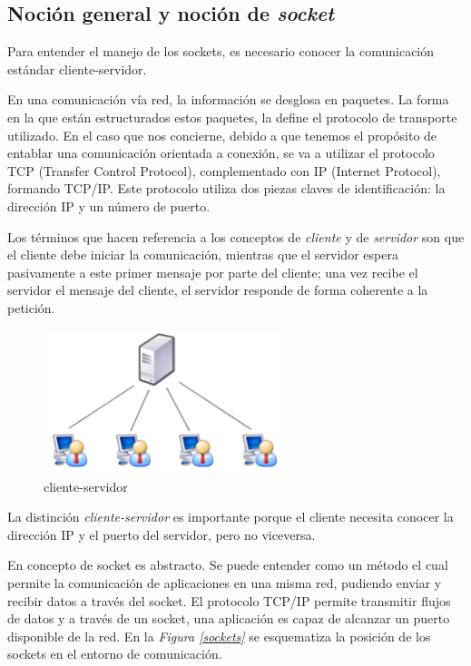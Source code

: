 \documentclass[a4paper,11pt]{book}
\begin{document}
			\subsection{Noción general y noción de \textit{socket}}
				Para entender el manejo de los sockets, es necesario conocer la comunicación estándar cliente-servidor.
				
				En una comunicación vía red, la información se desglosa en paquetes. La forma en la que están estructurados estos paquetes, la define el protocolo de transporte utilizado. En el caso que nos concierne, debido a que tenemos el propósito de entablar una comunicación orientada a conexión, se va a utilizar el protocolo TCP (Transfer Control Protocol), complementado con IP (Internet Protocol), formando TCP/IP. Este protocolo utiliza dos piezas claves de identificación: la dirección IP y un número de puerto.
				
				Los términos que hacen referencia a los conceptos de \textit{cliente} y de \textit{servidor} son que el cliente debe iniciar la comunicación, mientras que el servidor espera pasivamente a este primer mensaje por parte del cliente; una vez recibe el servidor el mensaje del cliente, el servidor responde de forma coherente a la petición.

				\begin{figure}[hbtp]
				\centering
				\includegraphics[width = 7cm]{FIGURAS/cliente-servidor.JPG}
				\caption{cliente-servidor}
				\end{figure}
				
				 La distinción \textit{cliente-servidor} es importante porque el cliente necesita conocer la dirección IP y el puerto del servidor, pero no viceversa.
				 
				 En concepto de socket es abstracto. Se puede entender como un método el cual permite la comunicación de aplicaciones en una misma red, pudiendo enviar y recibir datos a través del socket. El protocolo TCP/IP permite transmitir flujos de datos y a través de un socket, una aplicación es capaz de alcanzar un puerto disponible de la red. En la \textit{Figura \ref{sockets}} se esquematiza la posición de los sockets en el entorno de comunicación.
				 
\end{document}
